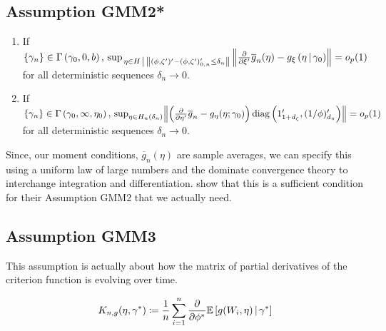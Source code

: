 \documentclass[11pt]{article}
\newcommand*{\E}{\mathbb{E}}
\newcommand*{\Eta}{H}
\newcommand*{\popmom}{\ensuremath{g}}
\newcommand*{\sampmom}{\ensuremath{\overline{g}_n}}
\DeclarePairedDelimiter\norm{\lVert}{\rVert}
\DeclareMathOperator{\diag}{diag}
\newcommand{\mvert}[1][\middle]{\ensuremath{\,#1\vert\,}}
\begin{document}
\subsection{Assumption GMM2*}


\begin{enumerate}
    \item If $\{\gamma_n\} \in \Gamma\left(\gamma_0, 0, b\right),\, \sup_{\left. \eta \in \Eta \mvert
        \norm*{(\phi, \zeta')' - (\phi, \zeta')_{0,n}'\leq \delta_n}\right.} \norm*{\frac{\partial}{\partial
        \xi'} \sampmom(\eta) - \popmom_{\xi}\left(\eta \mvert \gamma_0 \right)} = o_p(1)$  for all deterministic
        sequences  $\delta_n
        \to 0$.
    \item If $\{\gamma_n \} \in \Gamma\left(\gamma_0, \infty, \eta_0\right),\,  \sup_{\eta \in
        \Eta_{n}(\delta_n)} \norm*{\left(\frac{\partial}{\partial \eta'} \overline{g}_n - g_{\eta}(\eta ;
        \gamma_0)\right) \diag\left(1_{1+d_\zeta}', (1/\phi)_{d_{\pi}}'\right)}  = o_p(1)$ for all deterministic
        sequences $\delta_n \to 0$.
\end{enumerate}

Since, our moment conditions, $\sampmom(\eta)$ are sample averages, we can specify this using a uniform
law of large numbers and the dominate convergence theory to interchange integration and differentiation.
\textcite{andrewsGmm2014} show that this is a sufficient condition for their Assumption GMM2 that we actually
need.


\subsection{Assumption GMM3}

This assumption is actually about how the matrix of partial derivatives of the criterion function is
evolving over time. 

\begin{equation}
    K_{n,g}(\eta, \gamma^{*}) \coloneqq  \frac{1}{n} \sum_{i=1}^n \frac{\partial}{\partial \phi^{*}} \E \left[
    \popmom(W_i, \eta) \mvert \gamma^{*} \right]
\end{equation}
\end{document}
